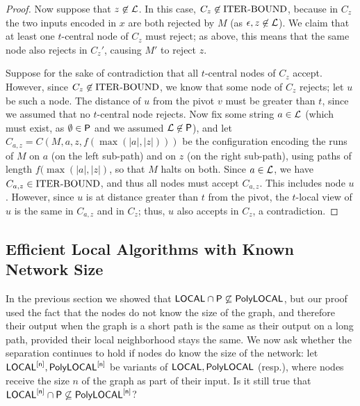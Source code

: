 \begin{proof}
Now suppose that $z \not \in \mathcal{L}$.
In this case, $C_z \not \in {\mathrm{ITER\text{-}BOUND}}$,
because in $C_z$ the two inputs encoded in $x$ are both rejected by $M$ (as $\epsilon, z \not \in \mathcal{L}$).
We claim that at least one $t$-central node of $C_z$ must reject;
as above, this means that the same node also rejects in $C_z'$,
causing $M'$ to reject $z$.

Suppose for the sake of contradiction that all $t$-central nodes of $C_z$ accept.
However, since $C_z \not \in {\mathrm{ITER\text{-}BOUND}}$, we know that some node of $C_z$ rejects;
let $u$ be such a node.
The distance of $u$ from the pivot $v$ must be greater than $t$, since we assumed that no $t$-central node rejects.
Now fix some string $a \in \mathcal{L}$ (which must exist, as $\emptyset \in {\mathsf{P}}$ and we assumed $\mathcal{L} \not \in {\mathsf{P}}$),
and let $C_{a,z} = C(M,a,z,f(\max(|a|,|z|)))$
be the configuration encoding the runs of $M$ on $a$ (on the left sub-path)
and on $z$ (on the right sub-path), using paths of length $f(\max(|a|,|z|)$,
so that $M$ halts on both.
Since $a \in \mathcal{L}$,
we have $C_{a,z} \in {\mathrm{ITER\text{-}BOUND}}$,
and thus all nodes must accept $C_{a,z}$.
This includes node $u$.
However, since $u$ is at distance greater than $t$ from the pivot,
the $t$-local view of $u$ is the same in $C_{a,z}$ and in $C_z$;
thus, $u$ also accepts in $C_z$, a contradiction.
\end{proof}












\subsection{Efficient Local Algorithms with Known Network Size}
\label{sec:owf}
In the previous section we showed that ${\mathsf{LOCAL}} \cap {\mathsf{P}} \not \subseteq {\mathsf{PolyLOCAL}}$,
but our proof used the fact that the nodes do not know the size of the graph,
and therefore their output when the graph is a short path is the same as their output on a long path,
provided their local neighborhood stays the same.
We now ask whether the separation continues to hold if nodes do know the size of the network:
let ${\mathsf{LOCAL}}^{[\mathsf{n}]}, \mathsf{PolyLOCAL}^{[\mathsf{n}]}$ be variants of ${\mathsf{LOCAL}}, {\mathsf{PolyLOCAL}}$ (resp.),
where nodes receive the size $n$ of the graph as part of their input.
Is it still true that ${\mathsf{LOCAL}}^{[\mathsf{n}]} \cap {\mathsf{P}} \not \subseteq \mathsf{PolyLOCAL}^{[\mathsf{n}]}$?

